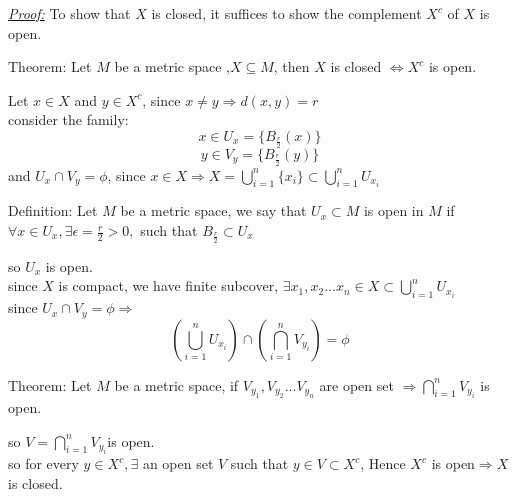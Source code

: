 \documentclass{amsbook}
\begin{document}
\begin{tcolorbox}[enhanced,attach boxed title to top center={yshift=-3mm,yshifttext=-1mm},
  colback=blue!5!white,colframe=blue!75!black,colbacktitle=red!80!black,
  title=Exercise 42.2:,fonttitle=\bfseries,
  boxed title style={size=small,colframe=red!50!black} ]
     \textit{\color{blue}\underline{Proof:}}
To show that $X$ is closed, it suffices to show the complement $X^c$ of $X$ is open.
\begin{tcolorbox}[colback=red!5!white,colframe=red!75!black]
 {\color{red}Theorem:}
Let $M$ be a metric space ,$X\subseteq M$, then $X$ is closed $\iff X^c$ is open.
 \end{tcolorbox}
Let $x\in X$ and $y\in X^c$, since $x\neq y\Rightarrow d(x,y)=r$\\
consider the family:
$$x\in U_x=\{B_{\frac{r}{2}}(x)\}$$
$$y\in V_y=\{B_{\frac{r}{2}}(y)\}$$
and $U_x\cap V_y=\phi$, since $x\in X\Rightarrow X=\bigcup_{i=1}^{n}\{x_i\}\subset\bigcup_{i=1}^{n}U_{x_i}$
\begin{tcolorbox}[colback=red!5!white,colframe=red!75!black]
{\color{red}Definition:}
 Let $M$ be a metric space, we say that $U_x\subset M$ is open in $M$ if $\forall x\in U_x,\exists 
 \epsilon=\frac{r}{2}>0,$ such that 
 $B_{\frac{r}{2}}\subset U_x$
 \end{tcolorbox}
so $U_x$ is open.\\
since $X$ is compact, we have finite subcover, $\exists x_1,x_2...x_n\in X\subset \bigcup_{i=1}^{n}U_{x_i}$\\
since $U_x\cap V_y=\phi\Longrightarrow$
$$\left( \bigcup_{i=1}^{n}U_{x_i}\right) \cap \left( \bigcap_{i=1}^{n}V_{y_i}\right)=\phi $$
\begin{tcolorbox}[colback=red!5!white,colframe=red!75!black]
{\color{red}Theorem:}
 Let $M$ be a metric space, if $V_{y_1},V_{y_2}...V_{y_n}$ are open set $\Rightarrow \bigcap_{i=1}^{n}V_{y_i}$ 
 is open.
 \end{tcolorbox}
so $V=\bigcap_{i=1}^{n}V_{y_i}$is open.\\
so for every $y\in X^c,\exists$ an open set $V$ such that $y \in V\subset X^c$, Hence $X^c$ is open$\Rightarrow 
X$ is closed.
\end{tcolorbox}

\end{document}
